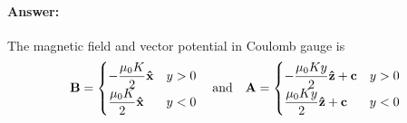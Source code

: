 \paragraph{Answer:} The magnetic field and vector potential in Coulomb gauge is 
\begin{equation}
    \bm{\mathrm{B}} = \begin{cases}\displaystyle
        -\frac{\mu_0 K}{2}\bm{\mathrm{\hat{x}}} & y > 0\\ \displaystyle
        \frac{\mu_0 K}{2}\bm{\mathrm{\hat{x}}} & y < 0
    \end{cases} \quad \text{and} \quad
    \bm{\mathrm{A}} = \begin{cases} \displaystyle
        -\frac{\mu_0 K y}{2}\bm{\mathrm{\hat{z}}} + \bm{\mathrm{c}} & y > 0\\ \displaystyle
        \frac{\mu_0 K y}{2}\bm{\mathrm{\hat{z}}} + \bm{\mathrm{c}} & y < 0
    \end{cases}
\end{equation}